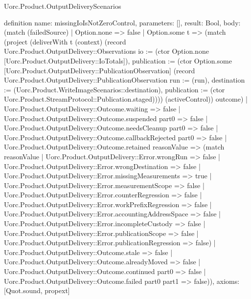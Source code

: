 \begin{lexlean}{Uorc.Product.OutputDeliveryScenarios}
\begin{semanticmodule}
definition{
  name: missingIoIsNotZeroControl,
  parameters: [],
  result: Bool,
  body: (match (failedSource)
    | Option.none => false
    | Option.some t => (match (project (deliverWith t (context) (record Uorc.Product.OutputDelivery::Observations {io := (ctor Option.none [Uorc.Product.OutputDelivery::IoTotals]), publication := (ctor Option.some [Uorc.Product.OutputDelivery::PublicationObservation] (record Uorc.Product.OutputDelivery::PublicationObservation {run := (run), destination := (Uorc.Product.WriteImageScenarios::destination), publication := (ctor Uorc.Product.StreamProtocol::Publication.staged)}))}) (activeControl)) outcome)
      | Uorc.Product.OutputDelivery::Outcome.waiting => false
      | Uorc.Product.OutputDelivery::Outcome.suspended part0 => false
      | Uorc.Product.OutputDelivery::Outcome.needsCleanup part0 => false
      | Uorc.Product.OutputDelivery::Outcome.callbackRejected part0 => false
      | Uorc.Product.OutputDelivery::Outcome.retained reasonValue => (match reasonValue
        | Uorc.Product.OutputDelivery::Error.wrongRun => false
        | Uorc.Product.OutputDelivery::Error.wrongDestination => false
        | Uorc.Product.OutputDelivery::Error.missingMeasurements => true
        | Uorc.Product.OutputDelivery::Error.measurementScope => false
        | Uorc.Product.OutputDelivery::Error.counterRegression => false
        | Uorc.Product.OutputDelivery::Error.workPrefixRegression => false
        | Uorc.Product.OutputDelivery::Error.accountingAddressSpace => false
        | Uorc.Product.OutputDelivery::Error.incompleteCustody => false
        | Uorc.Product.OutputDelivery::Error.publicationScope => false
        | Uorc.Product.OutputDelivery::Error.publicationRegression => false)
      | Uorc.Product.OutputDelivery::Outcome.stale => false
      | Uorc.Product.OutputDelivery::Outcome.alreadyMoved => false
      | Uorc.Product.OutputDelivery::Outcome.continued part0 => false
      | Uorc.Product.OutputDelivery::Outcome.failed part0 part1 => false)),
  axioms: [Quot.sound, propext]
}


\end{semanticmodule}
\end{lexlean}
